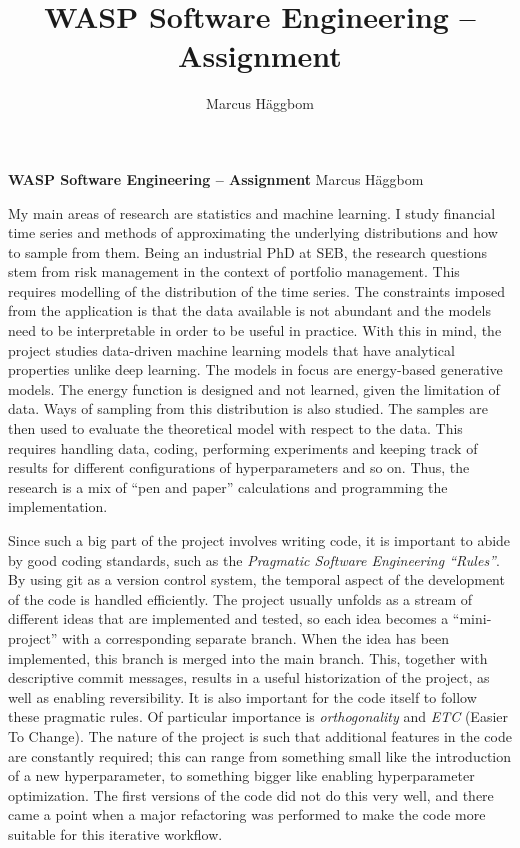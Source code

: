 \documentclass[11pt]{article}
\title{WASP Software Engineering -- Assignment}
\author{Marcus Häggbom}
\begin{document}
{\noindent \large \textbf{WASP Software Engineering -- Assignment}}
\hfill Marcus Häggbom
\vspace{2mm}

My main areas of research are statistics and machine learning. I study financial time series and methods of approximating the underlying distributions and how to sample from them. Being an industrial PhD at SEB, the research questions stem from risk management in the context of portfolio management. This requires modelling of the distribution of the time series. The constraints imposed from the application is that the data available is not abundant and the models need to be interpretable in order to be useful in practice. With this in mind, the project studies data-driven machine learning models that have analytical properties unlike deep learning. The models in focus are energy-based generative models. The energy function is designed and not learned, given the limitation of data. Ways of sampling from this distribution is also studied. The samples are then used to evaluate the theoretical model with respect to the data. This requires handling data, coding, performing experiments and keeping track of results for different configurations of hyperparameters and so on. Thus, the research is a mix of ``pen and paper'' calculations and programming the implementation.

Since such a big part of the project involves writing code, it is important to abide by good coding standards, such as the \textit{Pragmatic Software Engineering ``Rules''}. By using git as a version control system, the temporal aspect of the development of the code is handled efficiently. The project usually unfolds as a stream of different ideas that are implemented and tested, so each idea becomes a ``mini-project'' with a corresponding separate branch. When the idea has been implemented, this branch is merged into the main branch. This, together with descriptive commit messages, results in a useful historization of the project, as well as enabling reversibility. It is also important for the code itself to follow these pragmatic rules. Of particular importance is \textit{orthogonality} and \textit{ETC} (Easier To Change). The nature of the project is such that additional features in the code are constantly required; this can range from something small like the introduction of a new hyperparameter, to something bigger like enabling hyperparameter optimization. The first versions of the code did not do this very well, and there came a point when a major refactoring was performed to make the code more suitable for this iterative workflow.
\end{document}
